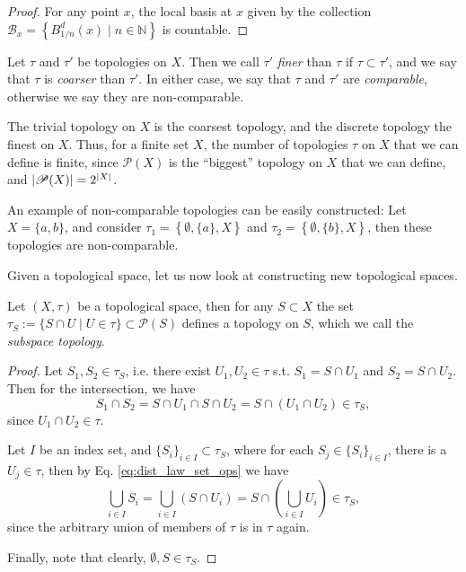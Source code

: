 \begin{proof}
	For any point $x$, the local basis at $x$ given by the collection $\mathscr B_x = \left\{ B_{1/n}^{d}(x) \mid n\in\mathbb N\right\}$ is countable.
\end{proof}

\begin{defn}\label{defn:comparison_of_topologies}
	Let $\tau$ and $\tau'$ be topologies on $X$. Then we call $\tau'$ \textit{finer} than $\tau$ if $\tau\subset\tau'$, and we say that $\tau$ is \textit{coarser} than $\tau'$. In either case, we say that $\tau$ and $\tau'$ are \textit{comparable}, otherwise we say they are non-comparable.
\end{defn}

\begin{remark}
	The trivial topology on $X$ is the coarsest topology, and the discrete topology the finest on $X$. Thus, for a finite set $X$, the number of topologies $\tau$ on $X$ that we can define is finite, since $\mathscr P(X)$ is the \enquote{biggest} topology on $X$ that we can define, and $\left\vert \mathscr P(X) \right\vert = 2^{\left\vert X \right\vert}$.
\end{remark}

\begin{remark}
	An example of non-comparable topologies can be easily constructed: Let $X = \{a, b\}$, and consider $\tau_1 = \left\{\emptyset, \{a\}, X\right\}$ and $\tau_2 = \left\{\emptyset, \{b\}, X\right\}$, then these topologies are non-comparable.
\end{remark}

Given a topological space, let us now look at constructing new topological spaces.

\begin{theorem}\label{thrm:subspace_topology}
	Let $(X, \tau)$ be a topological space, then for any $S\subset X$ the set
	$\tau_S := \{S \cap U \mid U\in \tau\}\subset \mathcal P(S)$ defines a topology on $S$, which we call the \textit{subspace topology}.
\end{theorem}

\begin{proof}
	Let $S_1, S_2\in \tau_S$, i.e. there exist $U_1, U_2\in \tau$ s.t. $S_1 = S\cap U_1$ and $S_2 = S\cap U_2$. Then for the intersection, we have 
	$$S_1 \cap S_2 = S\cap U_1\cap S\cap U_2 = S\cap (U_1\cap U_2) \in \tau_S, $$ since $U_1\cap U_2\in \tau$. 
	
	Let $I$ be an index set, and $\{S_i\}_{i\in I}\subset \tau_S$, where for each $S_j\in \{S_i\}_{i\in I}$, there is a $U_j\in \tau$, then by Eq. \eqref{eq:dist_law_set_ops} we have 
	$$\bigcup_{i\in I}S_i = \bigcup_{i\in I}\left(S\cap U_i\right) = S\cap \left(\bigcup_{i\in I}U_i\right)\in \tau_S,$$
	since the arbitrary union of members of $\tau$ is in $\tau$ again.
	
	Finally, note that clearly, $\emptyset, S\in \tau_S$.
\end{proof}

